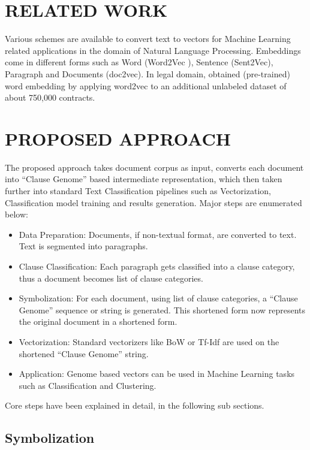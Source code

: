 \documentclass[9pt,academicons]{article}
\begin{document}
\section{RELATED WORK}
\label{sec:litsurvey}
Various schemes are available to convert text to vectors for Machine Learning related applications in the domain of Natural Language Processing. Embeddings come in different forms such as Word  (Word2Vec \cite{mikolov2013distributed}), Sentence (Sent2Vec), Paragraph and Documents (doc2vec). In legal domain, \cite{Chalkidis2017} obtained (pre-trained) word embedding by applying word2vec to an additional unlabeled dataset of about 750,000 contracts.

\section{PROPOSED APPROACH}
\label{sec:proposal}

The proposed approach takes document corpus as input, converts each document into ``Clause Genome'' based intermediate representation, which then taken further into standard Text Classification pipelines such as Vectorization, Classification model training and results generation. Major steps are enumerated below:

 \begin{itemize}
 \item Data Preparation: Documents, if non-textual format, are converted to text. Text is segmented into paragraphs.
  \item Clause Classification: Each paragraph gets classified into a clause category, thus a document becomes list of clause categories.
\item Symbolization: For each document, using list of clause categories, a ``Clause Genome'' sequence or string is generated. This shortened form now represents the original document in a shortened form.
\item Vectorization: Standard vectorizers like BoW or Tf-Idf are used on the shortened ``Clause Genome'' string.
\item Application: Genome based vectors can be used in Machine Learning tasks such as Classification and Clustering.
 \end{itemize}

Core steps have been explained in detail, in the following sub sections.

\subsection{Symbolization}
\label{subsec:symbolization}
\end{document}
